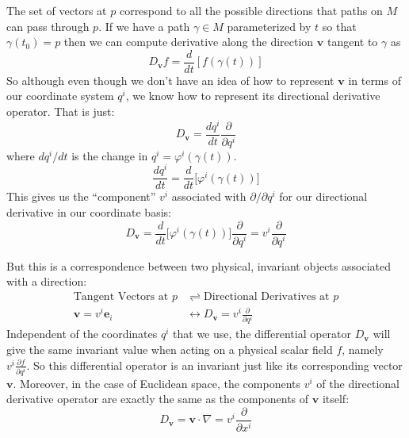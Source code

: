 \documentclass[../master.tex]{subfiles}
\begin{document}
	 The set of vectors at $p$ correspond to all the possible directions that paths on $M$ can pass through $p$. If we have a path $\gamma \in M$ parameterized by $t$ so that $\gamma(t_0) = p$ then we can compute derivative along the direction $\mathbf v$ tangent to $\gamma$ as
	 \begin{equation}
	 	D_\mathbf v f = \frac{d}{dt} \left[ f\left(\gamma(t) \right) \right]
	 \end{equation}
	 So although even though we don't have an idea of how to represent $\mathbf v$ in terms of our coordinate system $q^i$, we know how to represent its directional derivative operator. That is just:
	 \begin{equation}
		D_\mathbf v =  \frac{dq^i}{dt} \frac{\partial}{\partial q^i}
	 \end{equation}
	 where $dq^i/dt$ is the change in $q^i = \varphi^i(\gamma(t))$.
	 \begin{equation}
	 	\frac{dq^i}{dt} = \frac{d}{dt} \big[ \varphi^i(\gamma(t)) \big]
	 \end{equation}
	 This gives us the ``component'' $v^i$ associated with $\partial/\partial q^i$ for our directional derivative in our coordinate basis:
	 \begin{equation}
	 	D_\mathbf v = \frac{d}{dt} \big[ \varphi^i (\gamma(t))\big] \frac{\partial}{\partial q^i} = v^i \frac{\partial}{\partial q^i}
	 \end{equation}
	 
	But this is a correspondence between two physical, invariant objects associated with a direction:
	\begin{align*}
		\text{Tangent Vectors at $p$} &\rightleftharpoons \text{Directional Derivatives at $p$}\\
		\mathbf v = v^i \mathbf e_i &\longleftrightarrow D_\mathbf v = v^i \frac{\partial}{\partial q^i} 
	\end{align*}
	Independent of the coordinates $q^i$ that we use, the differential operator $D_{\mathbf v}$ will give the same invariant value when acting on a physical scalar field $f$, namely $v^i \frac{\partial f}{\partial q^i}$. So this differential operator is an invariant just like its corresponding vector $\mathbf v$. Moreover, in the case of Euclidean space, the components $v^i$ of the directional derivative operator are exactly the same as the components of $\mathbf v$ itself:
	\begin{equation}
		D_\mathbf v = \mathbf v \cdot \nabla = v^i \frac{\partial}{\partial x^i}
	\end{equation}
	
\end{document}
